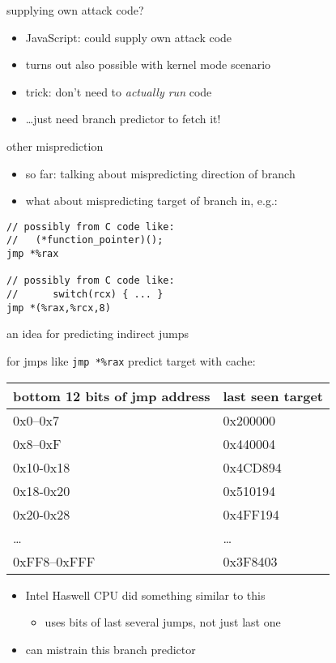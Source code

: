 \begin{frame}{supplying own attack code?}
    \begin{itemize}
    \item JavaScript: could supply own attack code
    \vspace{.5cm}
    \item turns out also possible with kernel mode scenario
    \item trick: don't need to \textit{actually run} code
    \item \ldots just need branch predictor to fetch it!
    \end{itemize}
\end{frame}

\begin{frame}[fragile]{other misprediction}
\begin{itemize}
\item so far: talking about mispredicting direction of branch
\item what about mispredicting target of branch in, e.g.:
\end{itemize}
\begin{lstlisting}[language=myasm]
// possibly from C code like:
//   (*function_pointer)();
jmp *%rax           

// possibly from C code like:
//      switch(rcx) { ... }
jmp *(%rax,%rcx,8)  
\end{lstlisting}
\end{frame}

\begin{frame}[fragile]{an idea for predicting indirect jumps}

for jmps like \lstinline|jmp *%rax| predict target with cache: \\
\begin{tabular}{ll}
bottom 12 bits of jmp address & last seen target \\ \hline
0x0--0x7 & 0x200000 \\
0x8--0xF & 0x440004 \\
0x10-0x18 & 0x4CD894 \\
0x18-0x20 & 0x510194 \\
0x20-0x28 & 0x4FF194 \\
\ldots & \ldots \\
0xFF8--0xFFF & 0x3F8403 \\
\end{tabular}
\begin{itemize}
\item Intel Haswell CPU did something similar to this
    \begin{itemize}
    \item uses bits of last several jumps, not just last one
    \end{itemize}
\item can mistrain this branch predictor
\end{itemize}
\end{frame}

